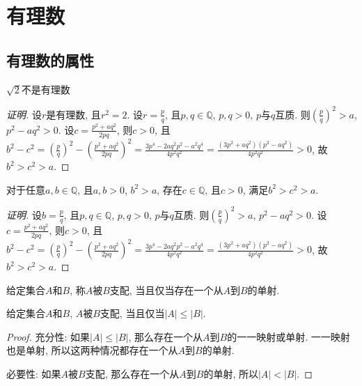 \chapter{有理数}

\section{有理数的属性}

\begin{proposition}
	$\sqrt{2}$不是有理数
\end{proposition}

\begin{proof}[证明]
	设$r$是有理数, 且$r^2=2$. 设$r=\frac{p}{q}$, 且$p,q\in \mathbb{Q}$, $p,q>0$, $p$与$q$互质. 则$(\frac{p}{q})^2>a$, $p^2-aq^2>0$. 设$c=\frac{p^2+aq^2}{2pq}$, 则$c>0$, 且$b^2-c^2=(\frac{p}{q})^2-(\frac{p^2+aq^2}{2pq})^2=\frac{3p^4-2aq^2p^2-a^2q^4}{4p^2q^2}=\frac{(3p^2+aq^2)(p^2-aq^2)}{4p^2q^2}>0$, 故$b^2>c^2>a$.
\end{proof}

\begin{proposition}[平方根的不可趋近性]
	对于任意$a, b\in \mathbb{Q}$, 且$a,b>0$, $b^2>a$, 存在$c\in \mathbb{Q}$, 且$c>0$, 满足$b^2>c^2>a$.
\end{proposition}

\begin{proof}[证明]
	设$b=\frac{p}{q}$, 且$p,q\in \mathbb{Q}$, $p,q>0$, $p$与$q$互质. 则$(\frac{p}{q})^2>a$, $p^2-aq^2>0$. 设$c=\frac{p^2+aq^2}{2pq}$, 则$c>0$, 且$b^2-c^2=(\frac{p}{q})^2-(\frac{p^2+aq^2}{2pq})^2=\frac{3p^4-2aq^2p^2-a^2q^4}{4p^2q^2}=\frac{(3p^2+aq^2)(p^2-aq^2)}{4p^2q^2}>0$, 故$b^2>c^2>a$.
\end{proof}


\begin{definition}[支配]
	给定集合$A$和$B$, 称$A$被$B$支配, 当且仅当存在一个从$A$到$B$的单射.
\end{definition}

\begin{proposition}
	给定集合$A$和$B$, $A$被$B$支配, 当且仅当$|A|\leqslant|B|$.
\end{proposition}

\begin{proof}
	充分性: 如果$|A|\leqslant|B|$, 那么存在一个从$A$到$B$的一一映射或单射. 一一映射也是单射, 所以这两种情况都存在一个从$A$到$B$的单射.
	
	必要性: 如果$A$被$B$支配, 那么存在一个从$A$到$B$的单射, 所以$|A|<|B|$.
\end{proof}